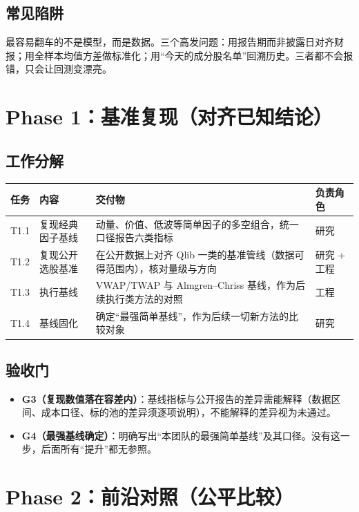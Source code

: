 \documentclass[11pt,a4paper]{ctexart}
\begin{document}
\subsection{常见陷阱}

最容易翻车的不是模型，而是数据。三个高发问题：用报告期而非披露日对齐财报；用全样本均值方差做标准化；用“今天的成分股名单”回溯历史。三者都不会报错，只会让回测变漂亮。

\section{Phase 1：基准复现（对齐已知结论）}

\subsection{工作分解}

\begin{longtable}{@{}>{\raggedright\arraybackslash}p{1.0cm}>{\raggedright\arraybackslash}p{4.4cm}>{\raggedright\arraybackslash}p{5.6cm}>{\raggedright\arraybackslash}p{2.6cm}@{}}
\toprule
任务 & 内容 & 交付物 & 负责角色 \\
\midrule
\endhead
T1.1 & 复现经典因子基线 & 动量、价值、低波等简单因子的多空组合，统一口径报告六类指标 & 研究 \\
T1.2 & 复现公开选股基准 & 在公开数据上对齐 Qlib 一类的基准管线（数据可得范围内），核对量级与方向 & 研究 + 工程 \\
T1.3 & 执行基线 & VWAP/TWAP 与 Almgren--Chriss 基线，作为后续执行类方法的对照 & 工程 \\
T1.4 & 基线固化 & 确定“最强简单基线”，作为后续一切新方法的比较对象 & 研究 \\
\bottomrule
\end{longtable}

\subsection{验收门}

\begin{itemize}
  \item \textbf{G3（复现数值落在容差内）}：基线指标与公开报告的差异需能解释（数据区间、成本口径、标的池的差异须逐项说明），不能解释的差异视为未通过。
  \item \textbf{G4（最强基线确定）}：明确写出“本团队的最强简单基线”及其口径。没有这一步，后面所有“提升”都无参照。
\end{itemize}

\section{Phase 2：前沿对照（公平比较）}
\end{document}
